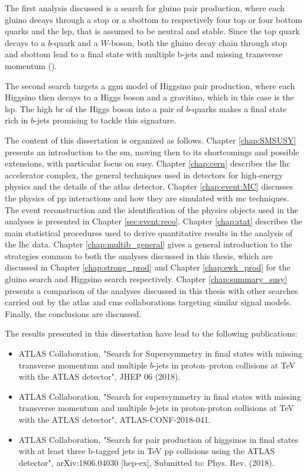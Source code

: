 The first analysis discussed is a search for gluino pair production, where each gluino decays through a stop or a sbottom 
to respectively four top or four bottom quarks and the \gls{lsp}, that is assumed to be neutral and stable.
Since the top quark decays to a $b$-quark and a $W$-boson, both the gluino decay chain through stop and sbottom lead to a 
final state with multiple b-jets and missing transverse momentum (\met). 

The second search targets a \gls{ggm} model of Higgsino pair production, where each Higgsino then decays to a Higgs boson and 
a gravitino, which in this case is the \gls{lsp}. The high \gls{br} of the Higgs boson into a pair of $b$-quarks makes a final state 
rich in $b$-jets promising to tackle this signature.

The content of this dissertation is organized as follows. Chapter \ref{chap:SMSUSY} presents an introduction to the \gls{sm}, 
moving then to its shortcomings and possible extensions, with particular focus on \gls{susy}. 
Chapter \ref{chap:cern} describes the \gls{lhc} accelerator complex, the general techniques used in detectors 
for high-energy physics and the details of the \gls{atlas} detector. 
Chapter \ref{chap:event:MC} discusses the physics of \gls{pp} interactions and how they are simulated with \gls{mc} techniques. 
The event reconstruction and the identification of the physics objects used in the analyses is presented in Chapter \ref{sec:event:reco}. 
Chapter \ref{chap:stat} describes the main statistical procedures used to derive quantitative results in the analysis of the \gls{lhc} data.
Chapter \ref{chap:multib_general} gives a general introduction to the strategies common to both the analyses discussed in this thesis, 
which are discussed in Chapter \ref{chap:strong_prod} and Chapter \ref{chap:ewk_prod} for the gluino search and 
Higgsino search respectively. 
Chapter \ref{chap:summary_susy} presents a comparison of the analyses discussed in this thesis with other searches carried out 
by the \gls{atlas} and \gls{cms} collaborations targeting similar signal models. 
Finally, the conclusions are discussed. 

The results presented in this dissertation have lead to the following publications:

\begin{itemize}
\item  ATLAS Collaboration, "Search for Supersymmetry in final states with missing transverse momentum and multiple $b$-jets in proton–proton collisions at \cmtre TeV with the ATLAS detector", JHEP 06 (2018). 
\item  ATLAS Collaboration, "Search for supersymmetry in final states with missing transverse momentum and multiple $b$-jets in proton-proton collisions at \cmtre TeV with the ATLAS detector", ATLAS-CONF-2018-041.
\item  ATLAS Collaboration, "Search for pair production of higgsinos in final states with at least three b-tagged jets in \cmtre TeV pp collisions using the ATLAS detector",  
arXiv:1806.04030 [hep-ex], 
Submitted to: Phys. Rev. (2018).
\end{itemize}

